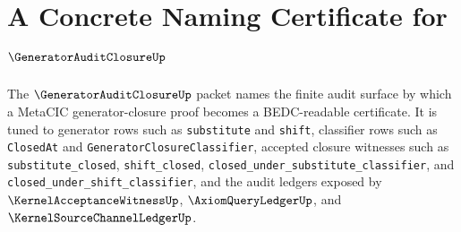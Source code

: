 \chapter{A Concrete Naming Certificate for $\GeneratorAuditClosureUp$}
\label{ch:concrete-instances-generatorauditclosure-namecert}

The $\GeneratorAuditClosureUp$ packet names the finite audit surface by which a MetaCIC generator-closure proof becomes a BEDC-readable certificate. It is tuned to generator rows such as \texttt{substitute} and \texttt{shift}, classifier rows such as \texttt{ClosedAt} and \texttt{GeneratorClosureClassifier}, accepted closure witnesses such as \texttt{substitute\_closed}, \texttt{shift\_closed}, \texttt{closed\_under\_substitute\_classifier}, and \texttt{closed\_under\_shift\_classifier}, and the audit ledgers exposed by $\KernelAcceptanceWitnessUp$, $\AxiomQueryLedgerUp$, and $\KernelSourceChannelLedgerUp$.

